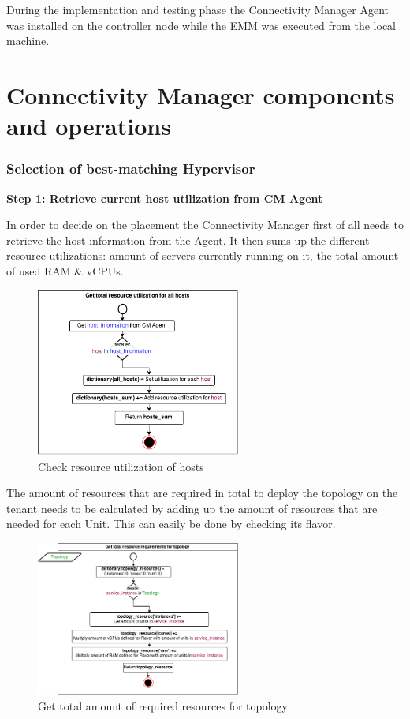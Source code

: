 During the implementation and testing phase the Connectivity Manager Agent was installed on the controller node while the EMM was executed from the local machine.

\section{Connectivity Manager components and operations}

\subsubsection{Selection of best-matching Hypervisor}


\textbf{Step 1: Retrieve current host utilization from CM Agent}

In order to decide on the placement the Connectivity Manager first of all needs to retrieve the host information from the Agent. It then sums up the different resource utilizations: amount of servers currently running on it, the total amount of used RAM \& vCPUs.
\begin{figure}[H]
\centering

\includegraphics[width=0.6\textwidth]{images/design/cm_get_host_utilization}

\caption{Check resource utilization of hosts}
\end{figure}

The amount of resources that are required in total to deploy the topology on the tenant needs to be calculated by adding up the amount of resources that are needed for each Unit. This can easily be done by checking its flavor.

\begin{figure}[H]
\centering

\includegraphics[width=0.6\textwidth]{images/design/cm_get_topology_requirements}

\caption{Get total amount of required resources for topology}
\end{figure}

